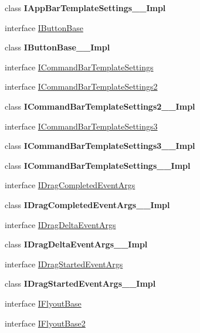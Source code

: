 \begin{DoxyCompactItemize}
\item 
class {\bfseries I\+App\+Bar\+Template\+Settings\+\_\+\+\_\+\+Impl}
\item 
interface \hyperlink{interface_windows_1_1_u_i_1_1_xaml_1_1_controls_1_1_primitives_1_1_i_button_base}{I\+Button\+Base}
\item 
class {\bfseries I\+Button\+Base\+\_\+\+\_\+\+Impl}
\item 
interface \hyperlink{interface_windows_1_1_u_i_1_1_xaml_1_1_controls_1_1_primitives_1_1_i_command_bar_template_settings}{I\+Command\+Bar\+Template\+Settings}
\item 
interface \hyperlink{interface_windows_1_1_u_i_1_1_xaml_1_1_controls_1_1_primitives_1_1_i_command_bar_template_settings2}{I\+Command\+Bar\+Template\+Settings2}
\item 
class {\bfseries I\+Command\+Bar\+Template\+Settings2\+\_\+\+\_\+\+Impl}
\item 
interface \hyperlink{interface_windows_1_1_u_i_1_1_xaml_1_1_controls_1_1_primitives_1_1_i_command_bar_template_settings3}{I\+Command\+Bar\+Template\+Settings3}
\item 
class {\bfseries I\+Command\+Bar\+Template\+Settings3\+\_\+\+\_\+\+Impl}
\item 
class {\bfseries I\+Command\+Bar\+Template\+Settings\+\_\+\+\_\+\+Impl}
\item 
interface \hyperlink{interface_windows_1_1_u_i_1_1_xaml_1_1_controls_1_1_primitives_1_1_i_drag_completed_event_args}{I\+Drag\+Completed\+Event\+Args}
\item 
class {\bfseries I\+Drag\+Completed\+Event\+Args\+\_\+\+\_\+\+Impl}
\item 
interface \hyperlink{interface_windows_1_1_u_i_1_1_xaml_1_1_controls_1_1_primitives_1_1_i_drag_delta_event_args}{I\+Drag\+Delta\+Event\+Args}
\item 
class {\bfseries I\+Drag\+Delta\+Event\+Args\+\_\+\+\_\+\+Impl}
\item 
interface \hyperlink{interface_windows_1_1_u_i_1_1_xaml_1_1_controls_1_1_primitives_1_1_i_drag_started_event_args}{I\+Drag\+Started\+Event\+Args}
\item 
class {\bfseries I\+Drag\+Started\+Event\+Args\+\_\+\+\_\+\+Impl}
\item 
interface \hyperlink{interface_windows_1_1_u_i_1_1_xaml_1_1_controls_1_1_primitives_1_1_i_flyout_base}{I\+Flyout\+Base}
\item 
interface \hyperlink{interface_windows_1_1_u_i_1_1_xaml_1_1_controls_1_1_primitives_1_1_i_flyout_base2}{I\+Flyout\+Base2}

\end{DoxyCompactItemize}
